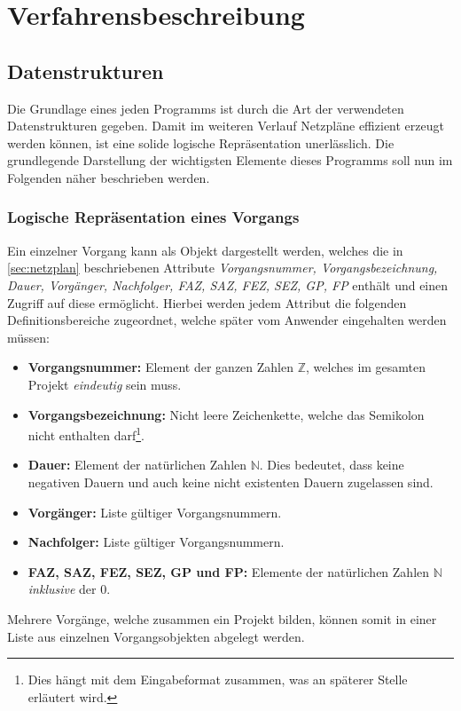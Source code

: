 \chapter{Verfahrensbeschreibung}
\label{Verfahrensbeschreibung}

\section{Datenstrukturen}

Die Grundlage eines jeden Programms ist durch die Art der verwendeten
Datenstrukturen gegeben. Damit im weiteren Verlauf Netzpl\"ane
effizient erzeugt werden k\"onnen, ist eine solide logische
Repr\"asentation unerl\"asslich. Die grundlegende Darstellung der
wichtigsten Elemente dieses Programms soll nun im Folgenden n\"aher
beschrieben werden.


\subsection{Logische Repr\"asentation eines Vorgangs}
\label{vorgang}
Ein einzelner Vorgang kann als Objekt dargestellt werden, welches die
in \ref{sec:netzplan} beschriebenen Attribute \textit{Vorgangsnummer,
  Vorgangsbezeichnung, Dauer, Vorg\"anger, Nachfolger, FAZ, SAZ, FEZ,
  SEZ, GP, FP}  enth\"alt und einen
Zugriff auf diese erm\"oglicht. Hierbei werden jedem Attribut die
folgenden Definitionsbereiche zugeordnet, welche sp\"ater vom Anwender
eingehalten werden m\"ussen:
\begin{itemize}
  \item \textbf{Vorgangsnummer:} Element der ganzen Zahlen \(\mathbb{Z}\),
    welches im gesamten Projekt \textit{eindeutig} sein muss.
  \item \textbf{Vorgangsbezeichnung:} Nicht leere Zeichenkette, welche
    das Semikolon nicht enthalten darf\footnote{Dies h\"angt mit dem
    Eingabeformat zusammen, was an sp\"aterer Stelle erl\"autert
    wird.}.
  \item \textbf{Dauer:} Element der nat\"urlichen Zahlen
    \(\mathbb{N}\). Dies bedeutet, dass keine negativen Dauern und
    auch keine nicht existenten Dauern zugelassen sind.
  \item \textbf{Vorg\"anger:} Liste g\"ultiger Vorgangsnummern.
  \item \textbf{Nachfolger:} Liste g\"ultiger Vorgangsnummern.
  \item \textbf{FAZ, SAZ, FEZ, SEZ, GP und FP:} Elemente der nat\"urlichen
    Zahlen \(\mathbb{N}\) \textit{inklusive} der \(0\).
\end{itemize}
Mehrere Vorg\"ange, welche zusammen ein Projekt bilden, k\"onnen somit in
einer Liste aus einzelnen Vorgangsobjekten abgelegt werden.


